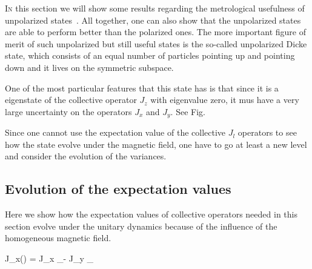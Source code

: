 \lettrine[lines=2, findent=3pt,nindent=0pt]{I}{n} this section we will show some results regarding the metrological usefulness of unpolarized states~\cite{Apellaniz2015}.
All together, one can also show that the unpolarized states are able to perform better than the polarized ones.
The more important figure of merit of such unpolarized but still useful states is the so-called unpolarized Dicke state, which consists of an equal number of particles pointing up and pointing down and it lives on the symmetric subspace.

One of the most particular features that this state has is that since it is a eigenstate of the collective operator $J_z$ with eigenvalue zero, it mus have a very large uncertainty on the operators $J_x$ and $J_y$. See Fig.

Since one cannot use the expectation value of the collective $J_l$ operators to see how the state evolve under the magnetic field, one have to go at least a new level and consider the evolution of the variances.

\subsection{Evolution of the expectation values}
Here we show how the expectation values of collective operators needed in this section evolve under the unitary dynamics because of the influence of the homogeneous magnetic field.

\be
  \tr J_x(\Theta) = J_x _\Theta - J_y _{\Theta}
\ee
